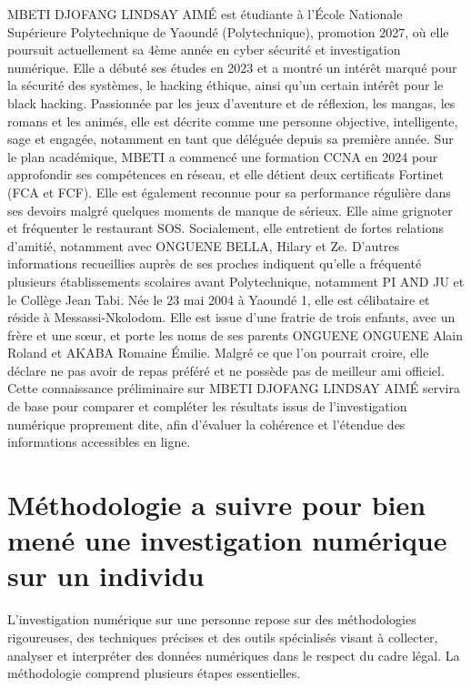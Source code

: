 \documentclass[12pt, a4paper]{article}
\begin{document}
	MBETI DJOFANG LINDSAY AIMÉ est étudiante à l'École Nationale Supérieure Polytechnique de Yaoundé (Polytechnique), promotion 2027, où elle poursuit actuellement sa 4ème année en cyber sécurité et investigation numérique. Elle a débuté ses études en 2023 et a montré un intérêt marqué pour la sécurité des systèmes, le hacking éthique, ainsi qu'un certain intérêt pour le black hacking. Passionnée par les jeux d'aventure et de réflexion, les mangas, les romans et les animés, elle est décrite comme une personne objective, intelligente, sage et engagée, notamment en tant que déléguée depuis sa première année. Sur le plan académique, MBETI a commencé une formation CCNA en 2024 pour approfondir ses compétences en réseau, et elle détient deux certificats Fortinet (FCA et FCF). Elle est également reconnue pour sa performance régulière dans ses devoirs malgré quelques moments de manque de sérieux. Elle aime grignoter et fréquenter le restaurant SOS. Socialement, elle entretient de fortes relations d'amitié, notamment avec ONGUENE BELLA, Hilary et Ze. D'autres informations recueillies auprès de ses proches indiquent qu'elle a fréquenté plusieurs établissements scolaires avant Polytechnique, notamment PI AND JU et le Collège Jean Tabi. Née le 23 mai 2004 à Yaoundé 1, elle est célibataire et réside à Messassi-Nkolodom. Elle est issue d'une fratrie de trois enfants, avec un frère et une sœur, et porte les noms de ses parents ONGUENE ONGUENE Alain Roland et AKABA Romaine Émilie. Malgré ce que l'on pourrait croire, elle déclare ne pas avoir de repas préféré et ne possède pas de meilleur ami officiel. Cette connaissance préliminaire sur MBETI DJOFANG LINDSAY AIMÉ servira de base pour comparer et compléter les résultats issus de l'investigation numérique proprement dite, afin d'évaluer la cohérence et l'étendue des informations accessibles en ligne.
	
	\newpage
	
	\section{\textbf{Méthodologie a suivre pour bien mené une investigation numérique sur un individu}\label{methodologie}}
	
	L'investigation numérique sur une personne repose sur des méthodologies rigoureuses, des techniques précises et des outils spécialisés visant à collecter, analyser et interpréter des données numériques dans le respect du cadre légal. La méthodologie comprend plusieurs étapes essentielles.
	
\end{document}
